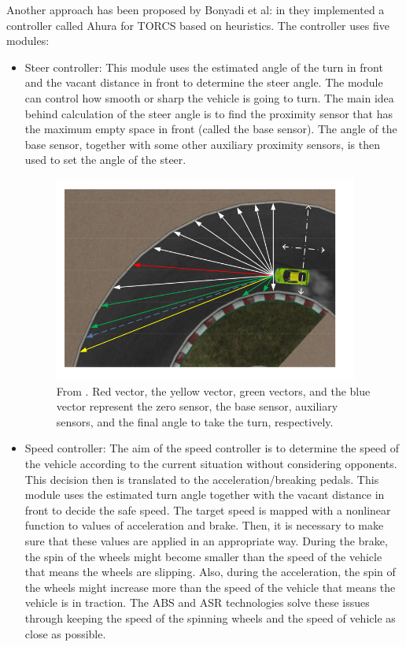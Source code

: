 Another approach has been proposed by Bonyadi et al: in \cite{ahura} they implemented a controller called Ahura for TORCS based on heuristics.
The controller uses five modules: 
\begin{itemize}
\item Steer controller: This module uses the estimated angle
of the turn in front and the vacant distance in front to determine the steer angle. The module can control how smooth or sharp the vehicle is going to turn.
The main idea behind calculation of the steer angle is to find the proximity sensor that has the maximum empty space in front (called the base sensor). The angle of the base sensor, together with some other auxiliary proximity sensors, is then used to set the angle of the steer.
\begin{figure}
 \centering
  \captionsetup{width=10cm}
  \includegraphics[width=10cm]{./img/ahura-steer}
  \caption{From \cite{ahura}. Red vector, the yellow vector, green vectors, and the blue vector represent the zero sensor, the base sensor, auxiliary sensors, and the final angle to take the turn, respectively.}
\end{figure}
\item Speed controller: The aim of the speed controller is to determine the speed of the vehicle according to the current situation without considering opponents. This decision then is translated to the acceleration/breaking pedals. This module uses the estimated turn angle together with the vacant distance in front to decide the safe speed.
The target speed is mapped with a nonlinear function to values of acceleration and brake. Then, it is necessary to make sure that these values are applied in an appropriate way.  During the brake, the spin of the wheels might become smaller than the speed of the vehicle that
means the wheels are slipping. Also, during the acceleration, the spin of the wheels might increase more than the speed of the vehicle that means the vehicle is in traction. The ABS and ASR technologies solve these issues through keeping the speed of the spinning wheels and the speed of vehicle as close as possible.

\end{itemize}

